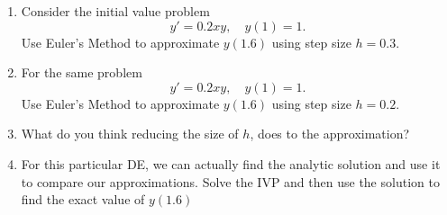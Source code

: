 \documentclass[12pt]{amsart}
\numberwithin{equation}{section}
\begin{document}
		\newpage

		\begin{enumerate}
			\item Consider the initial value problem
			\[y' = 0.2xy, \quad y(1) = 1.\]
			Use Euler's Method to approximate $y(1.6)$ using step size $h = 0.3.$
			\vspace{1in}
			
			\newpage

			\item For the same problem
			\[y' = 0.2xy, \quad y(1) = 1.\]
			Use Euler's Method to approximate $y(1.6)$ using step size $h = 0.2.$
			\vfill

			\item What do you think reducing the size of $h$, does to the approximation?
			\vspace{1in}

			\item For this particular DE, we can actually find the analytic solution and use it to
			compare our approximations.  Solve the IVP and then use the solution to 
			find the exact value of $y(1.6)$
			\vfill
		\end{enumerate}
\end{document}

